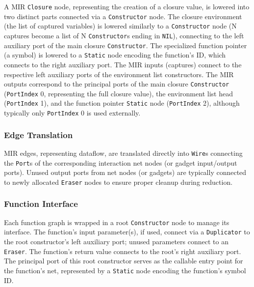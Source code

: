 A MIR \texttt{Closure} node, representing the creation of a closure value, is lowered into two distinct parts connected via a \texttt{Constructor} node. The closure environment (the list of captured variables) is lowered similarly to a \texttt{Constructor} node (N captures become a list of N \texttt{Constructor}s ending in \texttt{NIL}), connecting to the left auxiliary port of the main closure \texttt{Constructor}. The specialized function pointer (a symbol) is lowered to a \texttt{Static} node encoding the function's ID, which connects to the right auxiliary port. The MIR inputs (captures) connect to the respective left auxiliary ports of the environment list constructors. The MIR outputs correspond to the principal ports of the main closure \texttt{Constructor} (\texttt{PortIndex} 0, representing the full closure value), the environment list head (\texttt{PortIndex} 1), and the function pointer \texttt{Static} node (\texttt{PortIndex} 2), although typically only \texttt{PortIndex} 0 is used externally.


\subsubsection{Edge Translation}
MIR edges, representing dataflow, are translated directly into \texttt{Wire}s connecting the \texttt{Port}s of the corresponding interaction net nodes (or gadget input/output ports). Unused output ports from net nodes (or gadgets) are typically connected to newly allocated \texttt{Eraser} nodes to ensure proper cleanup during reduction.

\subsubsection{Function Interface}
Each function graph is wrapped in a root \texttt{Constructor} node to manage its interface. The function's input parameter(s), if used, connect via a \texttt{Duplicator} to the root constructor's left auxiliary port; unused parameters connect to an \texttt{Eraser}. The function's return value connects to the root's right auxiliary port. The principal port of this root constructor serves as the callable entry point for the function's net, represented by a \texttt{Static} node encoding the function's symbol ID.


